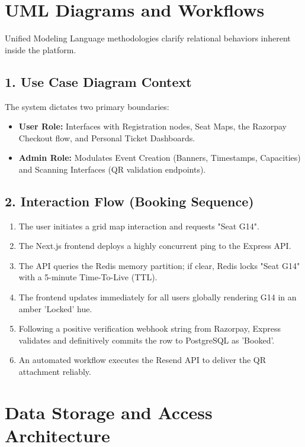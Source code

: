 \documentclass[12pt,a4paper]{report}
\begin{document}
\section{UML Diagrams and Workflows}

Unified Modeling Language methodologies clarify relational behaviors inherent inside the platform.

\subsection*{1. Use Case Diagram Context}
The system dictates two primary boundaries:
\begin{itemize}
    \item \textbf{User Role:} Interfaces with Registration nodes, Seat Maps, the Razorpay Checkout flow, and Personal Ticket Dashboards.
    \item \textbf{Admin Role:} Modulates Event Creation (Banners, Timestamps, Capacities) and Scanning Interfaces (QR validation endpoints).
\end{itemize}

\subsection*{2. Interaction Flow (Booking Sequence)}
\begin{enumerate}
    \item The user initiates a grid map interaction and requests "Seat G14".
    \item The Next.js frontend deploys a highly concurrent ping to the Express API.
    \item The API queries the Redis memory partition; if clear, Redis locks "Seat G14" with a 5-minute Time-To-Live (TTL).
    \item The frontend updates immediately for all users globally rendering G14 in an amber 'Locked' hue.
    \item Following a positive verification webhook string from Razorpay, Express validates and definitively commits the row to PostgreSQL as 'Booked'. 
    \item An automated workflow executes the Resend API to deliver the QR attachment reliably.
\end{enumerate}

\section{Data Storage and Access Architecture}
\end{document}
